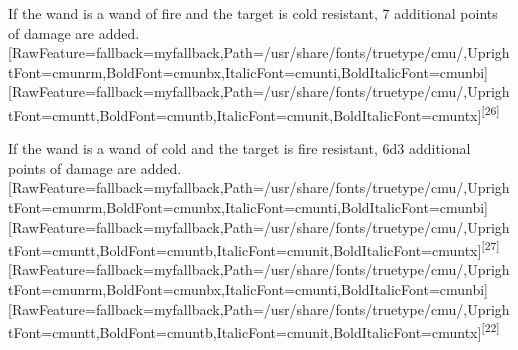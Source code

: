 If the wand is a wand of fire\footnotemark[112] and the target is cold resistant\footnotemark[113], 7 additional points of damage are added.\allowbreak{}\setmainfont{cmunrm.ttf}[RawFeature={fallback=myfallback},Path=/usr/share/fonts/truetype/cmu/,UprightFont=cmunrm,BoldFont=cmunbx,ItalicFont=cmunti,BoldItalicFont=cmunbi]\setmonofont{cmunrm.ttf}[RawFeature={fallback=myfallback},Path=/usr/share/fonts/truetype/cmu/,UprightFont=cmuntt,BoldFont=cmuntb,ItalicFont=cmunit,BoldItalicFont=cmuntx]\textsuperscript{{$\text{[}$}26{$\text{]}$}}


If the wand is a wand of cold\footnotemark[114] and the target is fire resistant\footnotemark[115], 6d3 additional points of damage are added.\allowbreak{}\setmainfont{cmunrm.ttf}[RawFeature={fallback=myfallback},Path=/usr/share/fonts/truetype/cmu/,UprightFont=cmunrm,BoldFont=cmunbx,ItalicFont=cmunti,BoldItalicFont=cmunbi]\setmonofont{cmunrm.ttf}[RawFeature={fallback=myfallback},Path=/usr/share/fonts/truetype/cmu/,UprightFont=cmuntt,BoldFont=cmuntb,ItalicFont=cmunit,BoldItalicFont=cmuntx]\textsuperscript{{$\text{[}$}27{$\text{]}$}}\allowbreak{}\setmainfont{cmunrm.ttf}[RawFeature={fallback=myfallback},Path=/usr/share/fonts/truetype/cmu/,UprightFont=cmunrm,BoldFont=cmunbx,ItalicFont=cmunti,BoldItalicFont=cmunbi]\setmonofont{cmunrm.ttf}[RawFeature={fallback=myfallback},Path=/usr/share/fonts/truetype/cmu/,UprightFont=cmuntt,BoldFont=cmuntb,ItalicFont=cmunit,BoldItalicFont=cmuntx]\textsuperscript{{$\text{[}$}22{$\text{]}$}}


